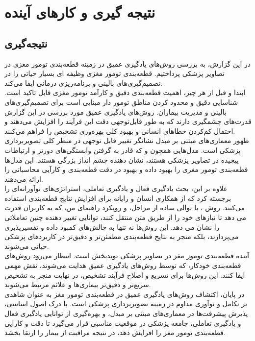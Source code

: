 \chapter{نتیجه گیری و کارهای آینده}
\thispagestyle{empty}
\section{نتیجه‌گیری}
در این گزارش، به بررسی روش‌های یادگیری عمیق در زمینه قطعه‌بندی تومور مغزی در تصاویر پزشکی پرداختیم. قطعه‌بندی تومور مغزی وظیفه ای بسیار حیاتی‌ را در تصمیم‌گیری‌های بالینی و برنامه‌ریزی درمانی ایفا می‌کند. 
\\
ابتدا و قبل از هر چیز، اهمیت قطعه‌بندی دقیق و کارآمد تومور مغزی قابل تاکید است. شناسایی دقیق و محدود کردن مناطق تومور دار مبنایی است برای تصمیم‌گیری‌های بالینی و مدیریت بیماران. روش‌های یادگیری عمیق مورد بررسی در این گزارش قدرت‌های چشمگیری دارند که به طور قابل‌توجهی دقت این فرآیند را افزایش می‌دهند و احتمال کم‌کردن خطاهای انسانی و بهبود کلی بهره‌وری تشخیص را فراهم می‌کنند.
\\
ظهور معماری‌های مبتنی بر مبدل نشانگر تغییر قابل توجهی در منظر کلی تصویربرداری پزشکی است. مدل‌هایی همچون و  که قادر به گرفتن وابستگی‌های دورتر و ارتباطات پیچیده در تصاویر پزشکی هستند، نشان دهنده چشم انداز بزرگی هستند. این مدل‌ها قطعه‌بندی تومور مغزی را بهبود داده و بهبود در دقت قطعه‌بندی و کارآیی محاسباتی را ارائه می‌دهند.
\\
علاوه بر این، بحث یادگیری فعال و یادگیری تعاملی، استراتژی‌های نوآورانه‌ای را برجسته کرد که از همکاری انسان و رایانه برای افزایش نتایج قطعه‌بندی استفاده می‌کنند. روش ، با توالی ساده از مراحل، و رویکرد راهنمای من، که به کاربران قدرت می دهد تا نیازهای خود را از طریق متن منتقل کنند، توانایی تغییر دهنده چنین تعاملاتی را نشان می دهد. این روش‌ها نه تنها به چالش‌های کمبود داده و تفسیرپذیری می‌پردازند، بلکه منجر به نتایج قطعه‌بندی مطمئن‌تر و دقیق‌تر در کاربردهای پزشکی حیاتی می‌شوند.
\\
آینده قطعه‌بندی تومور مغز در تصاویر پزشکی نویدبخش است. انتظار می‌رود روش‌های قطعه‌بندی خودکار، که توسط روش‌های یادگیری عمیق هدایت می‌شوند، نقش مهمی ایفا کنند. این روش‌ها برای تسریع و اصلاح فرآیند تشخیص، در نهایت منجر به تشخیص سریع‌تر و دقیق‌تر بیماری‌ها و علائم مرتبط می‌شوند.
\\
در پایان، اکتشاف روش‌های یادگیری عمیق در قطعه‌بندی تومور مغز به عنوان شاهدی بر تکامل و نوآوری مداوم در زمینه تصویربرداری پزشکی است. با درک اصول اساسی، پذیرش پیشرفت‌ها در معماری‌های مبتنی بر مبدل، و بهره‌گیری از توانایی یادگیری فعال و یادگیری تعاملی، جامعه پزشکی در موقعیت مناسبی قرار می‌گیرد تا دقت و کارایی قطعه‌بندی تومور مغز را افزایش دهد، در نتیجه مراقبت از بیمار را ارتقا بخشد. 
